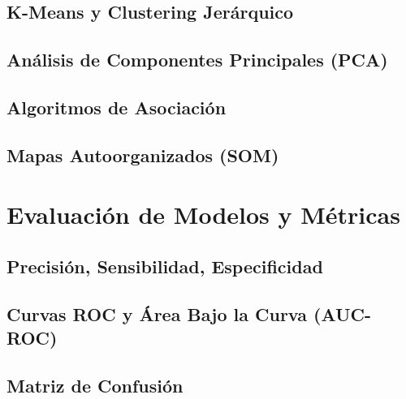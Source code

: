\documentclass{book}
\begin{document}
\subsection{K-Means y Clustering Jerárquico}
\newpage
\subsection{Análisis de Componentes Principales (PCA)}
\newpage
\subsection{Algoritmos de Asociación}
\newpage
\subsection{Mapas Autoorganizados (SOM)}
\newpage
\section{Evaluación de Modelos y Métricas}
\newpage
\subsection{Precisión, Sensibilidad, Especificidad}
\newpage
\subsection{Curvas ROC y Área Bajo la Curva (AUC-ROC)}
\newpage
\subsection{Matriz de Confusión}
\newpage
\end{document}
